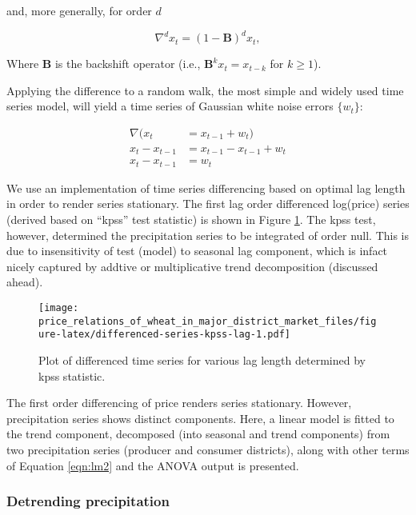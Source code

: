 \documentclass[
  12pt,
]{article}
\begin{document}
and, more generally, for order \(d\)

\begin{equation}
\nabla^d x_t = (1-\mathbf{B})^d x_t,
\label{eqn:order-d-difference-operator}
\end{equation}

Where \(\mathbf{B}\) is the backshift operator (i.e., \(\mathbf{B}^k x_t = x_{t-k}\) for \(k \geq 1\)).

Applying the difference to a random walk, the most simple and widely used time series model, will yield a time series of Gaussian white noise errors \(\{w_t\}\):

\begin{equation}
  \begin{aligned}
    \nabla (x_t &= x_{t-1} + w_t) \\
    x_t - x_{t-1} &= x_{t-1} - x_{t-1} + w_t \\
    x_t - x_{t-1} &= w_t
  \end{aligned}
  \label{eqn:random-walk-series}
\end{equation}

We use an implementation of time series differencing based on optimal lag length in order to render series stationary. The first lag order differenced log(price) series (derived based on ``kpss'' test statistic) is shown in Figure \ref{fig:differenced-series-kpss-lag}. The kpss test, however, determined the precipitation series to be integrated of order null. This is due to insensitivity of test (model) to seasonal lag component, which is infact nicely captured by addtive or multiplicative trend decomposition (discussed ahead).

\begin{figure}
\centering
\texttt{[image: price\_relations\_of\_wheat\_in\_major\_district\_market\_files/figure-latex/differenced-series-kpss-lag-1.pdf]}
\caption{\label{fig:differenced-series-kpss-lag}Plot of differenced time series for various lag length determined by kpss statistic.}
\end{figure}

The first order differencing of price renders series stationary. However, precipitation series shows distinct components. Here, a linear model is fitted to the trend component, decomposed (into seasonal and trend components) from two precipitation series (producer and consumer districts), along with other terms of Equation \ref{eqn:lm2} and the ANOVA output is presented.

\hypertarget{detrending-precipitation}{%
\subsubsection{Detrending precipitation}\label{detrending-precipitation}}
\end{document}
